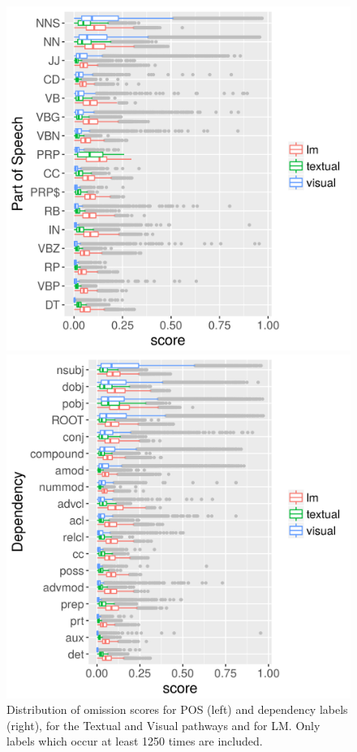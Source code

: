 \label{subsec:omission-text-vis}
\begin{figure}[!htbp]
\centering
  \includegraphics[scale=0.9]{chapters/COLI/imaginet-omission-pos-boxplot.png}

  \includegraphics[scale=0.9]{chapters/COLI/imaginet-omission-dep-boxplot.png}

\caption{Distribution of omission scores for POS (left) and dependency labels
  (right), for the {\sc Textual} and {\sc Visual} pathways and for
  {\sc LM}. Only labels which occur at least 1250 times are included.}
\label{fig:omission-imaginet}
\end{figure}

